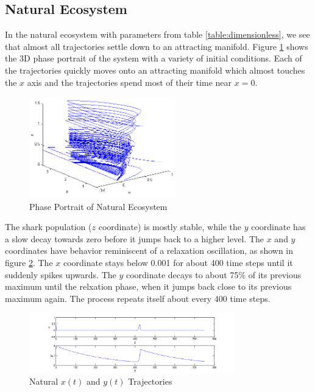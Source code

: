\documentclass[12pt,journal,compsoc,twoside]{IEEEtran}
\begin{document}
\subsection{Natural Ecosystem}

In the natural ecosystem with parameters from table \ref{table:dimensionless}, we see that almost all trajectories settle down to an attracting manifold. Figure \ref{naturaleco} shows the 3D phase portrait of the system with a variety of initial conditions. Each of the trajectories quickly moves onto an attracting manifold which almost touches the $x$ axis and the trajectories spend most of their time near $x = 0$. 

\begin{figure}[h!]
\centering
\includegraphics[width=2.5in]{naturaleco.png}
\caption{Phase Portrait of Natural Ecosystem }
\label{naturaleco}
\end{figure}

The shark population ($z$ coordinate) is mostly stable, while the $y$ coordinate has a slow decay towards zero before it jumps back to a higher level. The $x$ and $y$ coordinates have behavior reminiscent of a relaxation oscillation, as shown in figure \ref{naturalecoxy}. The $x$ coordinate stays below 0.001 for about 400 time steps until it suddenly spikes upwards. The $y$ coordinate decays to about 75\% of its previous maximum until the relxation phase, when it jumps back close to its previous maximum again. The process repeats itself about every 400 time steps.  

\begin{figure}[h!]
\centering
\includegraphics[width=3.5in]{naturalecoxy.png}
\caption{Natural $x(t)$ and $y(t)$ Trajectories}
\label{naturalecoxy}
\end{figure}
\end{document}
